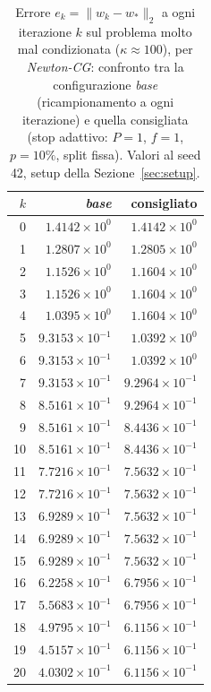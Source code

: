 \begin{table}[H]
\centering
\footnotesize
\renewcommand{\arraystretch}{0.85}
\setlength{\tabcolsep}{8pt}
\caption{Errore $e_k=\|w_k-w_*\|_2$ a ogni iterazione $k$ sul problema molto mal condizionata ($\kappa\approx 100$), per \emph{Newton-CG}: confronto tra la configurazione \emph{base} (ricampionamento a ogni iterazione) e quella consigliata (stop adattivo: $P{=}1$, $f{=}1$, $p{=}10\%$, split fissa). Valori al seed 42, setup della Sezione~\ref{sec:setup}.}
\label{tab:riuso_cons_veryill_ncg}
\begin{tabular}{@{}rrr@{}}
\toprule
$k$ & \emph{base} & consigliato\\
\midrule
0 & $1.4142\times10^{0}$ & $1.4142\times10^{0}$\\
1 & $1.2807\times10^{0}$ & $1.2805\times10^{0}$\\
2 & $1.1526\times10^{0}$ & $1.1604\times10^{0}$\\
3 & $1.1526\times10^{0}$ & $1.1604\times10^{0}$\\
4 & $1.0395\times10^{0}$ & $1.1604\times10^{0}$\\
5 & $9.3153\times10^{-1}$ & $1.0392\times10^{0}$\\
6 & $9.3153\times10^{-1}$ & $1.0392\times10^{0}$\\
7 & $9.3153\times10^{-1}$ & $9.2964\times10^{-1}$\\
8 & $8.5161\times10^{-1}$ & $9.2964\times10^{-1}$\\
9 & $8.5161\times10^{-1}$ & $8.4436\times10^{-1}$\\
10 & $8.5161\times10^{-1}$ & $8.4436\times10^{-1}$\\
11 & $7.7216\times10^{-1}$ & $7.5632\times10^{-1}$\\
12 & $7.7216\times10^{-1}$ & $7.5632\times10^{-1}$\\
13 & $6.9289\times10^{-1}$ & $7.5632\times10^{-1}$\\
14 & $6.9289\times10^{-1}$ & $7.5632\times10^{-1}$\\
15 & $6.9289\times10^{-1}$ & $7.5632\times10^{-1}$\\
16 & $6.2258\times10^{-1}$ & $6.7956\times10^{-1}$\\
17 & $5.5683\times10^{-1}$ & $6.7956\times10^{-1}$\\
18 & $4.9795\times10^{-1}$ & $6.1156\times10^{-1}$\\
19 & $4.5157\times10^{-1}$ & $6.1156\times10^{-1}$\\
20 & $4.0302\times10^{-1}$ & $6.1156\times10^{-1}$\\

\end{tabular}
\end{table}
